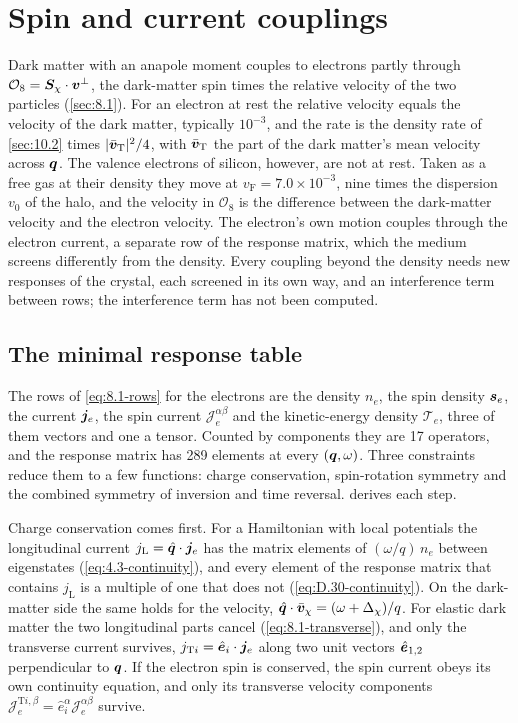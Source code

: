 \section{Spin and current couplings}\label{sec:10.4}

Dark matter with an anapole moment couples to electrons partly through $\mathcal{O}_8 = \bm{S}_\chi\cdot\bm{v}^\perp$, the dark-matter spin times the relative velocity of the two particles (\cref{sec:8.1}). For an electron at rest the relative velocity equals the velocity of the dark matter, typically $10^{-3}$, and the rate is the density rate of \cref{sec:10.2} times $|\bar{\bm{v}}_{\mathrm{T}}|^2/4$, with $\bar{\bm{v}}_{\mathrm{T}}$ the part of the dark matter's mean velocity across $\bm{q}$. The valence electrons of silicon, however, are not at rest. Taken as a free gas at their density they move at $v_{\mathrm{F}} = 7.0\times10^{-3}$, nine times the dispersion $v_0$ of the halo, and the velocity in $\mathcal{O}_8$ is the difference between the dark-matter velocity and the electron velocity. The electron's own motion couples through the electron current, a separate row of the response matrix, which the medium screens differently from the density. Every coupling beyond the density needs new responses of the crystal, each screened in its own way, and an interference term between rows; the interference term has not been computed.

\subsection{The minimal response table}\label{sec:10.4-table}

The rows of \cref{eq:8.1-rows} for the electrons are the density $n_e$, the spin density $\bm{s}_e$, the current $\bm{j}_e$, the spin current $\mathcal{J}^{\alpha\beta}_e$ and the kinetic-energy density $\mathcal{T}_e$, three of them vectors and one a tensor. Counted by components they are 17 operators, and the response matrix has 289 elements at every $(\bm{q},\omega)$. Three constraints reduce them to a few functions: charge conservation, spin-rotation symmetry and the combined symmetry of inversion and time reversal.  derives each step.

Charge conservation comes first. For a Hamiltonian with local potentials the longitudinal current $j_{\mathrm{L}} = \hat{\bm{q}}\cdot\bm{j}_e$ has the matrix elements of $(\omega/q)\,n_e$ between eigenstates (\cref{eq:4.3-continuity}), and every element of the response matrix that contains $j_{\mathrm{L}}$ is a multiple of one that does not (\cref{eq:D.30-continuity}). On the dark-matter side the same holds for the velocity, $\hat{\bm{q}}\cdot\bar{\bm{v}}_\chi = (\omega + \Delta_\chi)/q$. For elastic dark matter the two longitudinal parts cancel (\cref{eq:8.1-transverse}), and only the transverse current survives, $j_{\mathrm{T}i} = \hat{\bm{e}}_i\cdot\bm{j}_e$ along two unit vectors $\hat{\bm{e}}_{1,2}$ perpendicular to $\bm{q}$. If the electron spin is conserved, the spin current obeys its own continuity equation, and only its transverse velocity components $\mathcal{J}^{\mathrm{T}i,\beta}_e = \hat e^\alpha_i\mathcal{J}^{\alpha\beta}_e$ survive.

